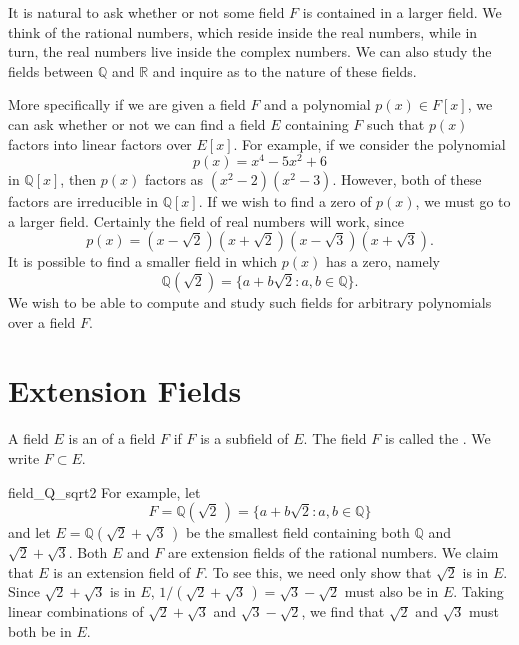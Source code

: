 
It is natural to ask whether or not some field $F$ is contained in a
larger field.  We think of the rational numbers, which reside inside
the real numbers, while in turn, the real numbers live inside the
complex numbers.  We can also study the fields between ${\mathbb Q}$ and
${\mathbb R}$ and inquire as to the nature of these fields.

 
More specifically if we are given a field $F$ and a polynomial $p(x)
\in F[x]$, we can ask whether or not we can find a field $E$
containing $F$ such that $p(x)$ factors into linear factors over
$E[x]$.  For example, if we consider the polynomial  
\[
p(x) =x^4 -5 x^2 + 6
\]
in ${\mathbb Q}[x]$,  then $p(x)$ factors as $(x^2 - 2)(x^2 - 3)$.
However, both of these factors are irreducible in ${\mathbb Q}[x]$.  If
we wish to find a zero of $p(x)$, we must go to a larger field.
Certainly the field of real numbers will work, since
\[
p(x) = (x - \sqrt{2} ) (x + \sqrt{2} )( x - \sqrt{3})(x + \sqrt{3}).
\]
It is possible to find a smaller field in which $p(x)$ has a zero,
namely 
\[
{\mathbb Q }( \sqrt{2} ) = \{ a + b \sqrt{2} : a, b \in {\mathbb Q} \}. 
\]
We wish to be able to compute and study such fields for arbitrary 
polynomials over a field $F$.  


\section{Extension Fields}

A field $E$ is an  of a field $F$
if $F$ is a subfield of $E$. The field $F$ is called the .  We write $F \subset E$.

\begin{example}{field_Q_sqrt2}
For example, let 
\[
F = {\mathbb Q}( \sqrt{2}\,) = \{ a + b \sqrt{2} : a, b \in {\mathbb Q} \}
\]
and
let
$E =  {\mathbb Q }( \sqrt{2} +  \sqrt{3}\,)$ be the smallest field
containing both ${\mathbb Q}$ and $\sqrt{2} + \sqrt{3}$. Both $E$ and $F$
are extension fields of the rational numbers. We claim that $E$ is an
extension field of $F$. To see this, we need only show that $\sqrt{2}$
is in $E$. Since $\sqrt{2} + \sqrt{3}$ is in $E$, $1 / (\sqrt{2} +
\sqrt{3}\,) = \sqrt{3} - \sqrt{2}$ must also be in $E$. Taking linear
combinations of $\sqrt{2} + \sqrt{3}$ and $\sqrt{3} - \sqrt{2}$, we
find that $\sqrt{2}$ and $\sqrt{3}$ must both be in $E$.
\end{example}


